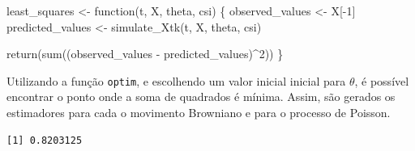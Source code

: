 \documentclass[
  letterpaper,
  DIV=11,
  numbers=noendperiod]{scrreprt}
\newenvironment{Shaded}{\begin{snugshade}}{\end{snugshade}}
\newcommand{\AttributeTok}[1]{\textcolor[rgb]{0.40,0.45,0.13}{#1}}
\newcommand{\ControlFlowTok}[1]{\textcolor[rgb]{0.00,0.23,0.31}{#1}}
\newcommand{\DecValTok}[1]{\textcolor[rgb]{0.68,0.00,0.00}{#1}}
\newcommand{\DocumentationTok}[1]{\textcolor[rgb]{0.37,0.37,0.37}{\textit{#1}}}
\newcommand{\FunctionTok}[1]{\textcolor[rgb]{0.28,0.35,0.67}{#1}}
\newcommand{\NormalTok}[1]{\textcolor[rgb]{0.00,0.23,0.31}{#1}}
\newcommand{\OtherTok}[1]{\textcolor[rgb]{0.00,0.23,0.31}{#1}}
\newcommand{\SpecialCharTok}[1]{\textcolor[rgb]{0.37,0.37,0.37}{#1}}
\begin{document}
\begin{Shaded}
\begin{Highlighting}[]
\NormalTok{least\_squares }\OtherTok{\textless{}{-}} \ControlFlowTok{function}\NormalTok{(t, X, theta, csi) \{}
\NormalTok{    observed\_values }\OtherTok{\textless{}{-}}\NormalTok{ X[}\SpecialCharTok{{-}}\DecValTok{1}\NormalTok{]}
\NormalTok{    predicted\_values }\OtherTok{\textless{}{-}} \FunctionTok{simulate\_Xtk}\NormalTok{(t, X, theta, csi)}

    \FunctionTok{return}\NormalTok{(}\FunctionTok{sum}\NormalTok{((observed\_values }\SpecialCharTok{{-}}\NormalTok{ predicted\_values)}\SpecialCharTok{\^{}}\DecValTok{2}\NormalTok{))}
\NormalTok{\}}
\end{Highlighting}
\end{Shaded}

Utilizando a função \texttt{optim}, e escolhendo um valor inicial
inicial para \(\theta\), é possível encontrar o ponto onde a soma de
quadrados é mínima. Assim, são gerados os estimadores para cada o
movimento Browniano e para o processo de Poisson.

\begin{Shaded}
\end{Shaded}

\begin{verbatim}
[1] 0.8203125
\end{verbatim}

\begin{Shaded}
\end{Shaded}
\end{document}
